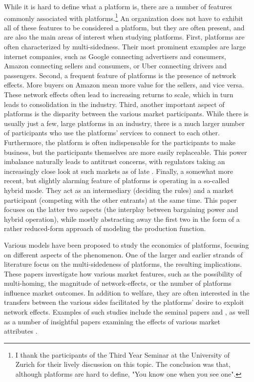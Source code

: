 \documentclass[a4paper]{article}
\begin{document}
While it is hard to define what a platform is, there are a number of features commonly associated with platforms.\footnote{
    I thank the participants of the Third Year Seminar at the University of Zurich for their lively discussion on this topic.
    The conclusion was that, although platforms are hard to define, "You know one when you see one".
}
An organization does not have to exhibit all of these features to be considered a platform, but they are often present, and are also the main areas of interest when studying platforms.
First, platforms are often characterized by multi-sidedness.
Their most prominent examples are large internet companies, such as Google connecting advertisers and consumers, Amazon connecting sellers and consumers, or Uber connecting drivers and passengers.
Second, a frequent feature of platforms is the presence of network effects.
More buyers on Amazon mean more value for the sellers, and vice versa.
These network effects often lead to increasing returns to scale, which in turn leads to consolidation in the industry.
Third, another important aspect of platforms is the disparity between the various market participants.
While there is usually just a few, large platforms in an industry, there is a much larger number of participants who use the platforms' services to connect to each other.
Furthermore, the platform is often indispensable for the participants to make business, but the participants themselves are more easily replaceable.
This power imbalance naturally leads to antitrust concerns, with regulators taking an increasingly close look at such markets as of late \parencite[see e.g. ][]{fletcher2021consumer}.
Finally, a somewhat more recent, but slightly alarming feature of platforms is operating in a so-called hybrid mode.
They act as an intermediary (deciding the rules) and a market participant (competing with the other entrants) at the same time.
This paper focuses on the latter two aspects (the interplay between bargaining power and hybrid operation), while mostly abstracting away the first two in the form of a rather reduced-form approach of modeling the production function.

Various models have been proposed to study the economics of platforms, focusing on different aspects of the phenomenon.
One of the larger and earlier strands of literature focus on the multi-sidedeness of platforms, the resulting implications.
These papers investigate how various market features, such as the possibility of multi-homing, the magnitude of network-effects, or the number of platforms influence market outcomes.
In addition to welfare, they are often interested in the transfers between the various sides facilitated by the platforms' desire to exploit network effects.
Examples of such studies include the seminal papers \textcite{rochet2003platform} and \textcite{armstrong2006competition}, as well as a number of insightful papers examining the effects of various market attributes \parencite[e.g.][]{hagiu2004optimal,choi2010tying,evans2011platform,lee2014competing}.
\end{document}
